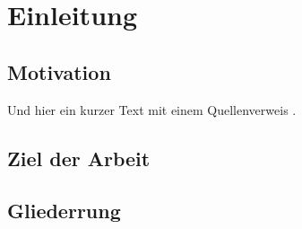 \chapter{Einleitung}
\blindtext

\section{Motivation}
Und hier ein kurzer Text mit einem Quellenverweis \autocite{Schlosser14}.

\Blindtext
\section{Ziel der Arbeit}
\Blindtext[2][3]
\section{Gliederrung}
\Blindtext[2][3]
